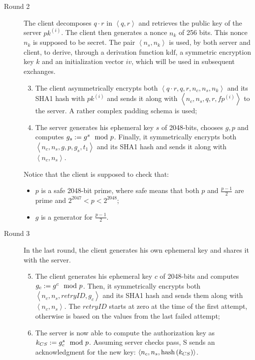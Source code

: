 \begin{description}
  \item[Round 2] The client decomposes $q\cdot r$ in $\left<q, r\right>$ and retrieves the public key of the server $pk^{\left(i\right)}$. The client then generates a nonce $n_k$ of 256 bits. This nonce $n_k$ is supposed to be secret. The pair $\left<n_s, n_k\right>$ is used, by both server and client, to derive, through a derivation function $\mbox{kdf}$, a symmetric encryption key $k$ and an initialization vector $iv$, which will be used in subsequent exchanges.
    \begin{enumerate}
      \setcounter{enumi}{2}
      \item{The client asymmetrically encrypts both $\left<q\cdot r, q, r, n_c, n_s, n_k\right>$ and its SHA1 hash with $pk^{(i)}$ and sends it along with $\left<n_c, n_s, q, r, fp^{(i)}\right>$ to the server. A rather complex padding schema is used;}
      \item{The server generates his \DiHe{} ephemeral key $s$ of 2048-bits, chooses $g, p$ and computes $g_s:= g^s \mod{p}$. Finally, it symmetrically encrypts both $\left<n_c, n_s, g, p, g_s, t_1\right>$ and its SHA1 hash and sends it along with $\left<n_c, n_s\right>$.}
    \end{enumerate}

    Notice that the client is supposed to check that:
    \begin{itemize}
      \label{item:DH-clients-checks}
      \item{$p$ is a safe 2048-bit prime, where safe means that both $p$ and $\frac{p-1}{2}$ are prime and $2^{2047} < p < 2^{2048}$;}
      \item{$g$ is a generator for $\frac{p-1}{2}$.}
    \end{itemize}

  \item[Round 3] In the last round, the client generates his own \DiHe{} ephemeral key and shares it with the server.
    \begin{enumerate}
      \setcounter{enumi}{4}
      \item{The client generates his ephemeral key $c$ of 2048-bits and computes $g_c:= g^c \mod{p}$. Then, it symmetrically encrypts both $\left<n_c, n_s, retryID, g_c\right>$ and its SHA1 hash and sends them along with $\left<n_c, n_s\right>$. The $retryID$ starts at zero at the time of the first attempt, otherwise is based on the values from the last failed attempt;}
      \item{The server is now able to compute the authorization key as $k_{CS}:= g_c^s \mod{p}$. Assuming server checks pass, S sends an acknowledgment for the new key: $\left<n_c, n_s, \mbox{hash}\left(k_{CS}\right)\right>$.}
    \end{enumerate}

\end{description}


